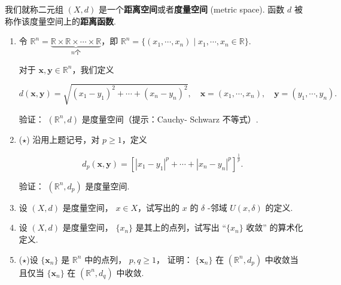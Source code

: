 我们就称二元组 $(X, d)$ 是一个\textbf{距离空间}或者\textbf{度量空间} (metric space). 函数 $d$ 被称作该度量空间上的\textbf{距离函数}.

\begin{enumerate}
    \item[1.]令 $\mathbb{R}^{n} = \underbrace{\mathbb{R} \times \mathbb{R} \times \cdots \times \mathbb{R}}_{n个}$，即 $\mathbb{R}^{n} = \{(x_{1}, \cdots , x_{n}) \mid x_{1}, \cdots , x_{n} \in \mathbb{R}\}$. 

    对于 $\mathbf{x}, \mathbf{y} \in \mathbb{R}^{n}$，我们定义

    \[d(\mathbf{x}, \mathbf{y}) = \sqrt{(x_{1} - y_{1})^{2} + \cdots + (x_{n} - y_{n})^{2}}, \quad \mathbf{x} = (x_{1}, \cdots , x_{n}), \quad \mathbf{y} = (y_{1}, \cdots , y_{n}).\]

    验证： $(\mathbb{R}^{n}, d)$ 是度量空间（提示：Cauchy- Schwarz 不等式）.

    \item[2.]($\star$) 沿用上题记号，对 $p \geq 1$，定义

    \[d_{p}(\mathbf{x}, \mathbf{y}) = \left[\left|x_{1} - y_{1}\right|^{p} + \cdots + \left|x_{n} - y_{n}\right|^{p}\right]^{\frac{1}{p}}.\]

    验证： $(\mathbb{R}^{n}, d_{p})$ 是度量空间.

    \item[3.]设 $(X, d)$ 是度量空间， $x \in X$，试写出的 $x$ 的 $\delta$ -邻域 $U(x, \delta)$ 的定义.

    \item[4.]设 $(X, d)$ 是度量空间， $\{x_{n}\}$ 是其上的点列，试写出 “$\{x_{n}\}$ 收敛” 的算术化定义.

    \item[5.]($\star$)设 $\{\mathbf{x}_{n}\}$ 是 $\mathbb{R}^{n}$ 中的点列， $p, q \geq 1$，
    证明： $\{\mathbf{x}_{n}\}$ 在 $(\mathbb{R}^{n}, d_{p})$ 中收敛当且仅当 $\{\mathbf{x}_{n}\}$ 在 $(\mathbb{R}^{n}, d_{q})$ 中收敛.
\end{enumerate}
